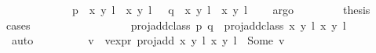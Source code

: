 \begin{isabellebody}
\ \ \ \ \ \ \ \ \ \ \ {\isacharparenleft}{}{\isacharparenright}\ {\isachardoublequoteopen}p\ {\isacharequal}\ {\isacharbraceleft}{\isacharparenleft}{\isacharparenleft}x{\isacharcomma}\ y{\isacharparenright}{\isacharcomma}\ l{\isacharparenright}{\isacharcomma}\ {\isacharparenleft}{\isasymtau}\ {\isacharparenleft}x{\isacharcomma}\ y{\isacharparenright}{\isacharcomma}\ l\ {\isacharplus}\ {}{\isacharparenright}{\isacharbraceright}{\isachardoublequoteclose}\ {\isachardoublequoteopen}q\ {\isacharequal}\ {\isacharbraceleft}{\isacharparenleft}{\isacharparenleft}x{\isacharprime}{\isacharcomma}\ y{\isacharprime}{\isacharparenright}{\isacharcomma}\ l{\isacharprime}{\isacharparenright}{\isacharcomma}\ {\isacharparenleft}{\isasymtau}\ {\isacharparenleft}x{\isacharprime}{\isacharcomma}\ y{\isacharprime}{\isacharparenright}{\isacharcomma}\ l{\isacharprime}\ {\isacharplus}\ {}{\isacharparenright}{\isacharbraceright}{\isachardoublequoteclose}\ \isamarkupfalse%
\ argo\ \isanewline
\ \ \ \ \isamarkupfalse%
\ \isamarkupfalse%
\ {\isacharquery}thesis\isanewline
\ \ \ \ \isamarkupfalse%
{\isacharparenleft}cases{\isacharparenright}\isanewline
\ \ \ \ \ \ \isamarkupfalse%
\ {}\isanewline
\ \ \ \ \ \ \isamarkupfalse%
\ \isamarkupfalse%
\ {\isachardoublequoteopen}proj{\isacharunderscore}add{\isacharunderscore}class\ p\ q\ {\isacharequal}\ proj{\isacharunderscore}add{\isacharunderscore}class\ {\isacharbraceleft}{\isacharparenleft}{\isacharparenleft}x{\isacharcomma}\ y{\isacharparenright}{\isacharcomma}\ l{\isacharparenright}{\isacharbraceright}\ {\isacharbraceleft}{\isacharparenleft}{\isacharparenleft}x{\isacharprime}{\isacharcomma}\ y{\isacharprime}{\isacharparenright}{\isacharcomma}\ l{\isacharprime}{\isacharparenright}{\isacharbraceright}{\isachardoublequoteclose}\isanewline
\ \ \ \ \ \ \ \ \isamarkupfalse%
\ auto\isanewline
\ \ \ \ \ \ \isamarkupfalse%
\ \isamarkupfalse%
\ v\ \ v{\isacharunderscore}expr{\isacharcolon}\ {\isachardoublequoteopen}proj{\isacharunderscore}add\ {\isacharparenleft}{\isacharparenleft}x{\isacharcomma}\ y{\isacharparenright}{\isacharcomma}\ l{\isacharparenright}\ {\isacharparenleft}{\isacharparenleft}x{\isacharprime}{\isacharcomma}\ y{\isacharprime}{\isacharparenright}{\isacharcomma}\ l{\isacharprime}{\isacharparenright}\ {\isacharequal}\ Some\ v{\isachardoublequoteclose}\isanewline
\ \ \ \ \ \ \ \ \isamarkupfalse%

\end{isabellebody}

